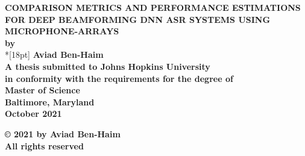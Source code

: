 \documentclass[12pt]{report}
\begin{document}
\newcommand{\bm}[1]{ \mbox{\boldmath $ #1 $} }
\newcommand{\bin}[2]{\left(\begin{array}{@{}c@{}} #1 \\ #2
             \end{array}\right) }
\renewcommand{\contentsname}{Table of Contents}
\baselineskip=24pt

\thispagestyle{empty}
\begin{center}
\vspace*{.25in}
{\bf\LARGE{ \MakeUppercase{Comparison metrics and performance
estimations for deep beamforming DNN ASR systems
using microphone-arrays }}}\\

\vspace*{.75in}
{\bf by} \\*[18pt]
\vspace*{.2in}
{\bf Aviad Ben-Haim}\\
\vspace*{1in}
{\bf A thesis submitted to Johns Hopkins University\\
in conformity with the requirements for the degree of\\
Master of Science }\\
\vspace*{.75in}
{\bf Baltimore, Maryland} \\
{\bf October 2021} \\
\vspace*{.5in}
\begin{small}
{\bf \copyright{ }2021 by Aviad Ben-Haim} \\
{\bf All rights reserved}
\end{small}
\end{center}
\newpage

\pagestyle{plain}
\setcounter{page}{2}




\pagestyle{plain}
\baselineskip=24pt
\tableofcontents

\listoftables
\listoffigures

\cleardoublepage %
\end{document}
